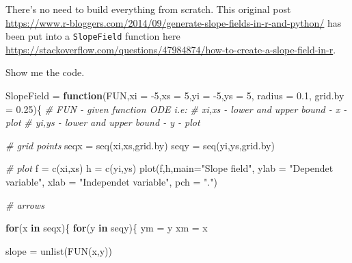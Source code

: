 \documentclass[
]{book}
\newenvironment{Shaded}{\begin{snugshade}}{\end{snugshade}}
\newcommand{\AttributeTok}[1]{\textcolor[rgb]{0.77,0.63,0.00}{#1}}
\newcommand{\CommentTok}[1]{\textcolor[rgb]{0.56,0.35,0.01}{\textit{#1}}}
\newcommand{\ControlFlowTok}[1]{\textcolor[rgb]{0.13,0.29,0.53}{\textbf{#1}}}
\newcommand{\DecValTok}[1]{\textcolor[rgb]{0.00,0.00,0.81}{#1}}
\newcommand{\FloatTok}[1]{\textcolor[rgb]{0.00,0.00,0.81}{#1}}
\newcommand{\FunctionTok}[1]{\textcolor[rgb]{0.00,0.00,0.00}{#1}}
\newcommand{\NormalTok}[1]{#1}
\newcommand{\OtherTok}[1]{\textcolor[rgb]{0.56,0.35,0.01}{#1}}
\newcommand{\SpecialCharTok}[1]{\textcolor[rgb]{0.00,0.00,0.00}{#1}}
\newcommand{\StringTok}[1]{\textcolor[rgb]{0.31,0.60,0.02}{#1}}
\begin{document}
There's no need to build everything from scratch. This original post \url{https://www.r-bloggers.com/2014/09/generate-slope-fields-in-r-and-python/} has been put into a \texttt{SlopeField} function here \url{https://stackoverflow.com/questions/47984874/how-to-create-a-slope-field-in-r}.

Show me the code.

\begin{Shaded}
\begin{Highlighting}[]
\NormalTok{SlopeField }\OtherTok{=} \ControlFlowTok{function}\NormalTok{(FUN,}\AttributeTok{xi =} \SpecialCharTok{{-}}\DecValTok{5}\NormalTok{,}\AttributeTok{xs =} \DecValTok{5}\NormalTok{,}\AttributeTok{yi =} \SpecialCharTok{{-}}\DecValTok{5}\NormalTok{,}\AttributeTok{ys =} \DecValTok{5}\NormalTok{, }\AttributeTok{radius =} \FloatTok{0.1}\NormalTok{, }\AttributeTok{grid.by =} \FloatTok{0.25}\NormalTok{)\{}
  \CommentTok{\# FUN   {-} given function ODE i.e:  }
  \CommentTok{\# xi,xs {-} lower and upper bound {-} x {-} plot}
  \CommentTok{\# yi,ys {-} lower and upper bound {-} y {-} plot}
  
  \CommentTok{\# grid points}
\NormalTok{  seqx }\OtherTok{=} \FunctionTok{seq}\NormalTok{(xi,xs,grid.by)}
\NormalTok{  seqy }\OtherTok{=} \FunctionTok{seq}\NormalTok{(yi,ys,grid.by)}
  
  \CommentTok{\# plot}
\NormalTok{  f }\OtherTok{=} \FunctionTok{c}\NormalTok{(xi,xs) }
\NormalTok{  h }\OtherTok{=} \FunctionTok{c}\NormalTok{(yi,ys)}
  \FunctionTok{plot}\NormalTok{(f,h,}\AttributeTok{main=}\StringTok{"Slope field"}\NormalTok{, }\AttributeTok{ylab =} \StringTok{"Dependet variable"}\NormalTok{, }\AttributeTok{xlab =} \StringTok{"Independet variable"}\NormalTok{, }\AttributeTok{pch =} \StringTok{"."}\NormalTok{)}
  
  \CommentTok{\# arrows}
  
  \ControlFlowTok{for}\NormalTok{(x }\ControlFlowTok{in}\NormalTok{ seqx)\{}
    \ControlFlowTok{for}\NormalTok{(y }\ControlFlowTok{in}\NormalTok{ seqy)\{}
\NormalTok{      ym }\OtherTok{=}\NormalTok{ y}
\NormalTok{      xm }\OtherTok{=}\NormalTok{ x}
      
\NormalTok{      slope }\OtherTok{=} \FunctionTok{unlist}\NormalTok{(}\FunctionTok{FUN}\NormalTok{(x,y))}
      

\end{Highlighting}
\end{Shaded}
\end{document}
